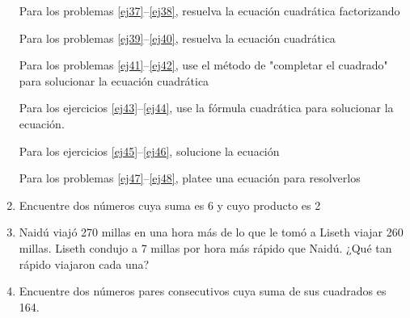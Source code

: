 \documentclass[letterpaper,twoside]{article}
\begin{document}
\begin{multicols}{2}
\begin{enumerate}
Para los problemas \ref{ej37}--\ref{ej38}, resuelva la ecuación cuadrática factorizando
Para los problemas \ref{ej39}--\ref{ej40}, resuelva la ecuación cuadrática
Para los problemas \ref{ej41}--\ref{ej42}, use el método de "completar el cuadrado" para solucionar la ecuación cuadrática
Para los ejercicios \ref{ej43}--\ref{ej44}, use la fórmula cuadrática para solucionar la ecuación.
Para los ejercicios \ref{ej45}--\ref{ej46}, solucione la ecuación
Para los problemas \ref{ej47}--\ref{ej48}, platee una ecuación para resolverlos
\item \label{ej47} Encuentre dos números cuya suma es 6 y cuyo producto es 2
\item Naidú viajó 270 millas en una hora más de lo que le tomó a Liseth viajar 260 millas. Liseth condujo a 7 millas por hora más rápido que Naidú. ¿Qué tan rápido viajaron cada una?
\item \label{ej48} Encuentre dos números pares consecutivos cuya suma de sus cuadrados es 164.

\end{enumerate}
\end{multicols}
\end{document}
